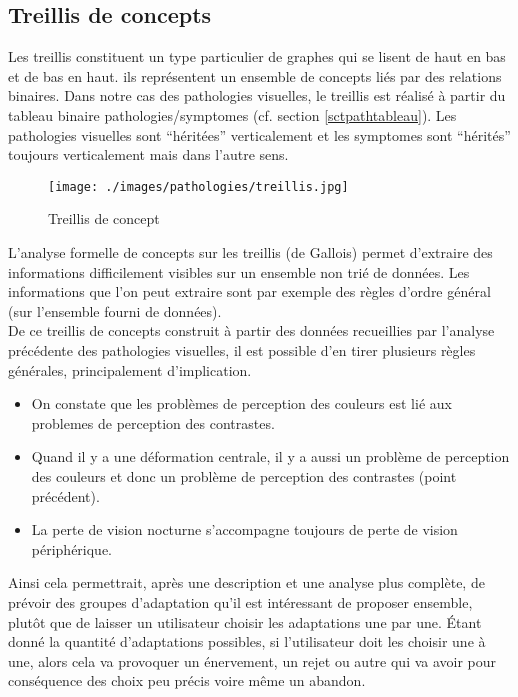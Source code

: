 \documentclass[french,a4paper]{report}
\begin{document}
{\subsection{Treillis de concepts}
Les treillis constituent un type particulier de graphes qui se lisent de haut en bas et de bas
en haut. ils représentent un ensemble de concepts liés par des relations binaires. Dans notre
cas des pathologies visuelles, le treillis est réalisé à partir du tableau binaire
pathologies/\glspl{symptome} (cf. section \ref{sctpathtableau}). Les pathologies visuelles
sont \enquote{héritées} verticalement et les \glspl{symptome} sont \enquote{hérités} toujours
verticalement mais dans l'autre sens.\\
\begin{figure}[H]\centering
\texttt{[image: ./images/pathologies/treillis.jpg]}
\vspace{-0.2cm}
\caption{Treillis de concept}
\vspace{-1cm}
\end{figure}
L'analyse formelle de concepts sur les treillis (de Gallois) permet d'extraire des informations
difficilement visibles sur un ensemble non trié de données. Les informations que l'on peut
extraire sont par exemple des règles d'ordre général (sur l'ensemble fourni de données).\\
De ce treillis de concepts construit à partir des données recueillies par l'analyse précédente
des pathologies visuelles, il est possible d'en tirer plusieurs règles générales, principalement
d'implication. \\
\begin{itemize}
\item On constate que les problèmes de perception des couleurs est lié aux problemes
de perception des contrastes.
\item Quand il y a une déformation centrale, il y a aussi un problème de
perception des couleurs et donc un problème de perception des contrastes (point précédent).
\item La perte de vision nocturne s'accompagne toujours de perte de vision périphérique.\\
\end{itemize}
Ainsi cela permettrait, après une description et une analyse plus
complète, de prévoir des groupes d'adaptation qu'il est intéressant de
proposer ensemble, plutôt que de laisser un utilisateur choisir les
adaptations une par une. Étant donné la quantité d'adaptations possibles,
si l'utilisateur doit les choisir une à une, alors cela va provoquer un
énervement, un rejet ou autre qui va avoir pour conséquence des choix peu précis voire
même un abandon.
}
\end{document}
